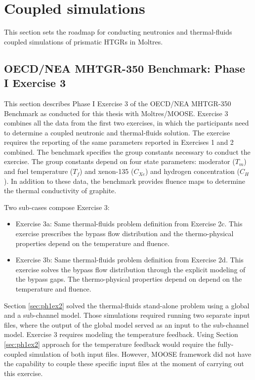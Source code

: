 \section{Coupled simulations}
\label{sec:thermal-coupling}

This section sets the roadmap for conducting neutronics and thermal-fluids coupled simulations of prismatic HTGRs in Moltres.

\subsection{OECD/NEA MHTGR-350 Benchmark: Phase I Exercise 3}
\label{sec:ph1ex3}

This section describes Phase I Exercise 3 of the OECD/NEA MHTGR-350 Benchmark as conducted for this thesis with Moltres/MOOSE.
Exercise 3 combines all the data from the first two exercises, in which the participants need to determine a coupled neutronic and thermal-fluids solution.
The exercise requires the reporting of the same parameters reported in Exercises 1 and 2 combined.
The benchmark specifies the group constants necessary to conduct the exercise.
The group constants depend on four state parameters: moderator ($T_m$) and fuel temperature ($T_f$) and xenon-135 ($C_{Xe}$) and hydrogen concentration ($C_H$).
In addition to these data, the benchmark provides fluence maps to determine the thermal conductivity of graphite.

Two sub-cases compose Exercise 3:
\begin{itemize}
  \item Exercise 3a: Same thermal-fluids problem definition from Exercise 2c. This exercise prescribes the bypass flow distribution and the thermo-physical properties depend on the temperature and fluence.
  \item Exercise 3b: Same thermal-fluids problem definition from Exercise 2d. This exercise solves the bypass flow distribution through the explicit modeling of the bypass gaps. The thermo-physical properties depend on depend on the temperature and fluence.
\end{itemize}

Section \ref{sec:ph1ex2} solved the thermal-fluids stand-alone problem using a global and a sub-channel model.
Those simulations required running two separate input files, where the output of the global model served as an input to the sub-channel model.
Exercise 3 requires modeling the temperature feedback.
Using Section \ref{sec:ph1ex2} approach for the temperature feedback would require the fully-coupled simulation of both input files.
However, MOOSE framework did not have the capability to couple these specific input files at the moment of carrying out this exercise.

